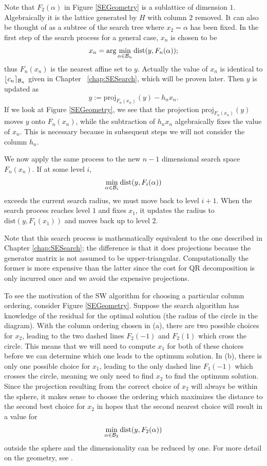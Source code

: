 \documentclass[12pt,Bold,letterpaper]{mcgilletdclass}
\newcommand{\dist}{\mathrm{dist}}
\begin{document}
Note that $F_2(\alpha)$ in Figure \ref{SEGeometry} is a sublattice of dimension $1$.  
Algebraically it is the lattice generated by $H$ with column
$2$ removed. It can also be thought of as a subtree of the search tree where
$x_2 = \alpha$ has been fixed. 
In the first step of the search process for a general case, $x_n$ is chosen to be
$$x_n=\arg\min_{\alpha\in {\cal B}_n}\dist(y,F_n(\alpha));$$ thus $F_n(x_n)$ is the nearest affine set to $y$. 
Actually the value of $x_n$ is identical to $\lfloor c_n \rceil_{{\cal B}_n}$ given in Chapter ~\ref{chap:SESearch},
which will be proven later.
Then  $y$ is updated  as $$y := \mbox{proj}_{F_n(x_n)}(y) - h_nx_n.$$ If we look
at Figure \ref{SEGeometry}, we see that the projection $\mbox{proj}_{F_n(x_n)}(y)$ moves $y$ onto $F_n(x_n)$, while the subtraction of $h_nx_n$ algebraically fixes the value of $x_n$. This is necessary because in subsequent steps we will not consider the column $h_n$.

We now apply the same process to the new $n-1$ dimensional search space
$F_n(x_n)$. If at some level $i$, $$\min_{\alpha\in {\cal B}_i}\dist(y,F_i(\alpha))$$ exceeds the current
search radius, we must move back to level $i+1$. %
When the search process reaches level $1$ and fixes $x_1$, it updates the radius to  
$\dist(y,F_1(x_1))$ and moves back up to level $2$.

Note that this search process is mathematically equivalent to the one described in Chapter
\ref{chap:SESearch}; the difference is that it  does projections
because  the generator matrix is not assumed to be upper-triangular. 
Computationally the former is more expensive than the latter since the cost for QR decomposition is only incurred once and we avoid the expensive projections.

To see the motivation of the SW algorithm for choosing a particular column ordering,
consider Figure \ref{SEGeometry}. Suppose the search algorithm has knowledge of
the residual for the optimal solution (the radius of the circle in the diagram).
With the column ordering chosen in (a), there are two possible choices for $x_2$,
leading to the two dashed lines $F_2(-1)$ and $F_2(1)$ which cross the circle. This means
that we will need to compute $x_1$ for both of these choices
before we can determine which one leads to the optimum solution. In (b), there
is only one possible choice for $x_1$,  leading to the only dashed line $F_1(-1)$
which crosses the circle, meaning we only need to find $x_2$ to find the optimum solution.
Since the projection resulting from the correct choice of $x_2$ will always be
within the sphere, it makes sense to choose the ordering which maximizes the
distance to the second best choice for $x_2$ in hopes that the second nearest
choice will result in a value for $$\min_{\alpha\in {\cal B}_2}\dist(y,F_2(\alpha))$$ outside the sphere and the
dimensionality can be reduced by one. 
For more detail on the geometry, see  \cite{SuW05}.
\end{document}
